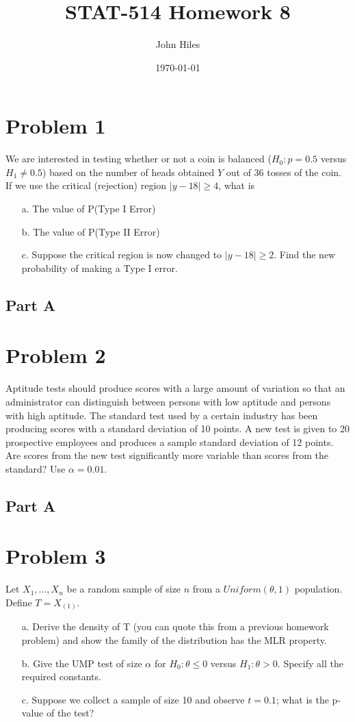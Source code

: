 \documentclass{article}
\title{STAT-514 Homework 8}
\author{John Hiles}
\date\today
\begin{document}
\maketitle %

\section*{Problem 1}
We are interested in testing whether or not a coin is balanced ($H_0:p=0.5$ versus $H_1\neq 0.5$) based on the number of heads obtained $Y$ out of 36 tosses of the coin. If we use the
critical (rejection) region $|y - 18| \geq 4$, what is
\begin{enumerate}
\item[a.] The value of P(Type I Error)
\item[b.] The value of P(Type II Error)
\item[c.] Suppose the critical region is now changed to $|y-18| \geq 2$. Find the new probability of making a Type I error.
\end{enumerate}
\subsection*{Part A}
\clearpage

\section*{Problem 2}
Aptitude tests should produce scores with a large amount of variation so that an administrator can distinguish between persons with low aptitude and persons with high aptitude. The standard test used by a certain industry has been producing scores with a standard deviation of 10 points. A new test is given to 20 prospective employees and produces a sample standard deviation of 12 points. Are scores from the new test significantly more variable than scores from the standard? Use $\alpha = 0.01$.
\subsection*{Part A}

\clearpage

\section*{Problem 3}
Let $X_1,...,X_n$ be a random sample of size $n$ from a $Uniform(\theta,1)$ population. Define $T=X_{(1)}$.
\begin{enumerate}
\item[a.] Derive the density of T (you can quote this from a previous homework problem) and show the family of the distribution has the MLR property.
\item[b.] Give the UMP test of size $\alpha$ for $H_0 : \theta \leq 0$ versus $H_1 : \theta > 0$. Specify all the required
constants.
\item[c.] Suppose we collect a sample of size 10 and observe $t = 0.1$; what is the p-value of the test?
\end{enumerate}
\end{document}
